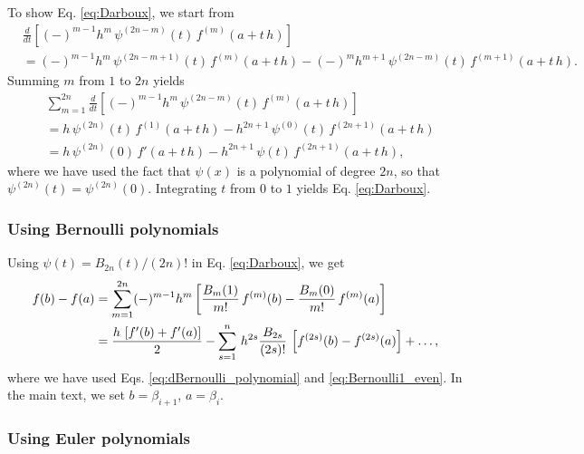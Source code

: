 \documentclass[aip,jcp,preprint,notitlepage, superscriptaddress]{revtex4-1}
\begin{document}
To show Eq. \eqref{eq:Darboux},
we start from
%
\begin{align*}
&\frac{ d } { dt }
\left[
  (-)^{m - 1} h^m \,
  \psi^{(2 n - m)}(t) \, f^{(m)}(a + t \, h)
\right]
\\
&=
(-)^{m-1} h^m \,
  \psi^{(2 n - m + 1)}(t) \, f^{(m)}(a + t \, h)
-
(-)^m h^{m + 1} \,
  \psi^{(2 n - m)}(t) \, f^{(m + 1)}(a + t \, h).
\end{align*}
%
Summing $m$ from $1$ to $2 n$ yields
%
\begin{align*}
&\sum_{m = 1}^{2 n}
\frac{ d } { dt }
  \left[
    (-)^{m - 1} h^m \,
    \psi^{(2 n - m)}(t) \, f^{(m)}(a + t \, h)
  \right]
\\
&=
h \,
  \psi^{(2 n)}(t) \, f^{(1)}(a + t \, h)
-
h^{2 n + 1} \,
  \psi^{(0)}(t) \, f^{(2 n + 1)}(a + t \, h)
\\
&=
h \,
  \psi^{(2 n)}(0) \, f'(a + t \, h)
-
h^{2 n + 1} \,
  \psi(t) \, f^{(2 n + 1)}(a + t \, h),
\end{align*}
%
where
we have used the fact that
$\psi(x)$ is a polynomial of degree $2n$,
so that
$\psi^{(2 n)}(t) = \psi^{(2 n)}(0)$.
%
Integrating $t$ from $0$ to $1$
yields Eq. \eqref{eq:Darboux}.



\subsubsection{Using Bernoulli polynomials}



Using $\psi(t) = B_{2n}(t)/(2n)!$ in Eq. \eqref{eq:Darboux},
we get
\begin{align}
f(b) - f(a)
&=
\sum_{m = 1}^{2n}
  (-)^{m - 1} h^m
  \left[
    \frac{ B_m(1) } {m!} \, f^{(m)}(b)
    -
    \frac{ B_m(0) } {m!} \, f^{(m)}(a)
  \right]
\notag \\
&=
\frac{ h \, \left[
    f'(b) + f'(a)
  \right]
} {2 }
-
\sum_{s = 1}^{n}
\, h^{2 s}
\frac{ B_{2 s} }{ (2 s)! }
    \, \left[f^{(2 s)}(b) - f^{(2 s)}(a)\right]
  + \dots,
\label{eq:Darboux_Bernoulli}
\end{align}
where we have used
Eqs. \eqref{eq:dBernoulli_polynomial} and \eqref{eq:Bernoulli1_even}.
%
In the main text,
we set $b = \beta_{i + 1}$,
$a = \beta_i$.



\subsubsection{Using Euler polynomials}
\end{document}
